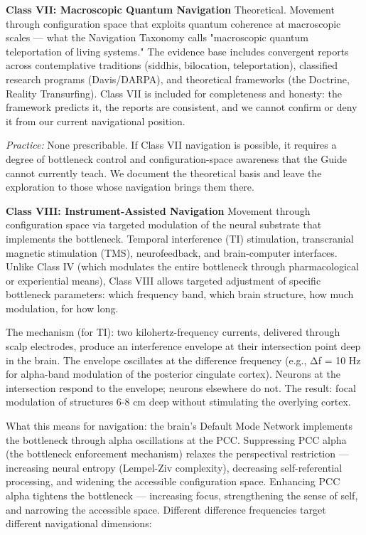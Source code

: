 \textbf{Class VII: Macroscopic Quantum Navigation} Theoretical. Movement through configuration space that exploits quantum coherence at macroscopic scales — what the Navigation Taxonomy calls "macroscopic quantum teleportation of living systems." The evidence base includes convergent reports across contemplative traditions (siddhis, bilocation, teleportation), classified research programs (Davis/\allowbreak DARPA), and theoretical frameworks (the Doctrine, Reality Transurfing). Class VII is included for completeness and honesty: the framework predicts it, the reports are consistent, and we cannot confirm or deny it from our current navigational position.


\textit{Practice:} None prescribable. If Class VII navigation is possible, it requires a degree of bottleneck control and configuration-space awareness that the Guide cannot currently teach. We document the theoretical basis and leave the exploration to those whose navigation brings them there.


\textbf{Class VIII: Instrument-Assisted Navigation} Movement through configuration space via targeted modulation of the neural substrate that implements the bottleneck. Temporal interference (TI) stimulation, transcranial magnetic stimulation (TMS), neurofeedback, and brain-computer interfaces. Unlike Class IV (which modulates the entire bottleneck through pharmacological or experiential means), Class VIII allows targeted adjustment of specific bottleneck parameters: which frequency band, which brain structure, how much modulation, for how long.


The mechanism (for TI): two kilohertz-frequency currents, delivered through scalp electrodes, produce an interference envelope at their intersection point deep in the brain. The envelope oscillates at the difference frequency (e.g., Δf = 10 Hz for alpha-band modulation of the posterior cingulate cortex). Neurons at the intersection respond to the envelope; neurons elsewhere do not. The result: focal modulation of structures 6-8 cm deep without stimulating the overlying cortex.


What this means for navigation: the brain's Default Mode Network implements the bottleneck through alpha oscillations at the PCC. Suppressing PCC alpha (the bottleneck enforcement mechanism) relaxes the perspectival restriction — increasing neural entropy (Lempel-Ziv complexity), decreasing self-referential processing, and widening the accessible configuration space. Enhancing PCC alpha tightens the bottleneck — increasing focus, strengthening the sense of self, and narrowing the accessible space. Different difference frequencies target different navigational dimensions:



